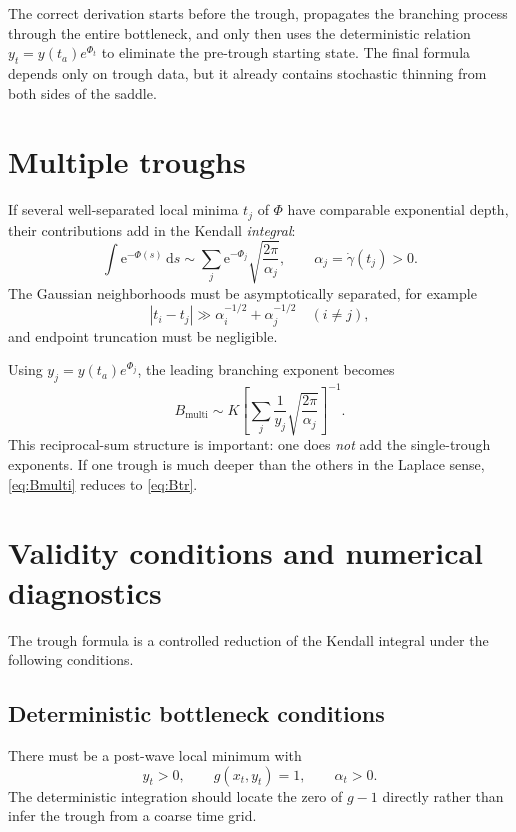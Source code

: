 \documentclass[11pt]{article}
\newcommand{\dd}{\,\mathrm d}
\newcommand{\e}{\mathrm e}
\newcommand{\gam}{\gamma}
\newcommand{\PhiB}{\Phi}
\begin{document}
The correct derivation starts before the trough, propagates the branching process through the entire bottleneck, and only then uses the deterministic relation \(y_t=y(t_a)e^{\PhiB_t}\) to eliminate the pre-trough starting state. The final formula depends only on trough data, but it already contains stochastic thinning from both sides of the saddle.

\section{Multiple troughs}

If several well-separated local minima \(t_j\) of \(\PhiB\) have comparable exponential depth, their contributions add in the Kendall \emph{integral}:
\begin{equation}
\int\e^{-\PhiB(s)}\dd s
\sim
\sum_j
\e^{-\PhiB_j}\sqrt{\frac{2\pi}{\alpha_j}},
\qquad
\alpha_j=\dot\gam(t_j)>0.\label{eq:multisaddleint}
\end{equation}
The Gaussian neighborhoods must be asymptotically separated, for example
\[
|t_i-t_j|\gg \alpha_i^{-1/2}+\alpha_j^{-1/2}
\quad(i\ne j),
\]
and endpoint truncation must be negligible.

Using \(y_j=y(t_a)e^{\PhiB_j}\), the leading branching exponent becomes
\begin{equation}
\boxed{
B_{\mathrm{multi}}
\sim
K\left[
\sum_j
\frac1{y_j}
\sqrt{\frac{2\pi}{\alpha_j}}
\right]^{-1}.}
\label{eq:Bmulti}
\end{equation}
This reciprocal-sum structure is important: one does \emph{not} add the single-trough exponents. If one trough is much deeper than the others in the Laplace sense, \eqref{eq:Bmulti} reduces to \eqref{eq:Btr}.

\section{Validity conditions and numerical diagnostics}

The trough formula is a controlled reduction of the Kendall integral under the following conditions.

\subsection{Deterministic bottleneck conditions}

There must be a post-wave local minimum with
\[
 y_t>0,\qquad g(x_t,y_t)=1,\qquad \alpha_t>0.
\]
The deterministic integration should locate the zero of \(g-1\) directly rather than infer the trough from a coarse time grid.
\end{document}
